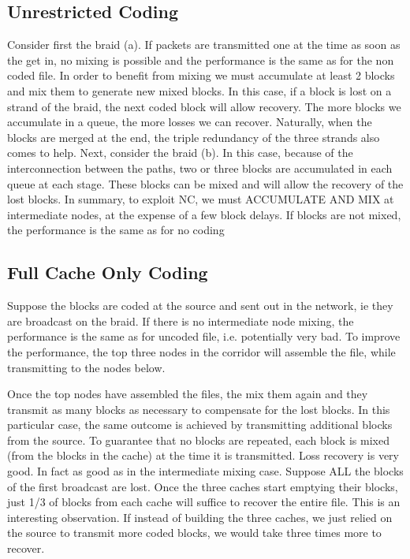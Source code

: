 \subsection{Unrestricted Coding}
	 	 	
 Consider first the braid (a). If packets are transmitted one at the time as soon as the get in, no mixing is possible and the performance is the same as for the non coded file.
In order to benefit from mixing we must accumulate at least 2 blocks and mix them to generate new mixed blocks. In this case, if a block is lost on a strand of the braid, the next coded block will allow recovery. The more blocks we accumulate in a queue, the more losses we can recover. Naturally, when the blocks are merged at the end, the triple redundancy of the three strands also comes to help. Next, consider the braid (b). In this case, because of the interconnection between the paths, two or three blocks are accumulated in each queue at each stage. These blocks can be mixed and will allow the recovery of the lost blocks. In summary, to exploit NC, we must ACCUMULATE AND MIX at intermediate nodes, at the expense of a few block delays. If blocks are not mixed, the performance is the same as for no coding


\subsection{Full Cache Only Coding}
	 	 	
Suppose the blocks are coded at the source and sent out in the network, ie they are broadcast on the braid. If there is no intermediate node mixing, the performance is the same as for uncoded file, i.e. potentially very bad. To improve the performance, the top three nodes in the corridor will assemble the file, while transmitting to the nodes below.

	 	 	
Once the top nodes have assembled the files, the mix them again and they transmit as many blocks as necessary to compensate for the lost blocks. In this particular case, the same outcome is achieved by transmitting additional blocks from the source. To guarantee that no blocks are repeated, each block is mixed (from the blocks in the cache) at the time it is transmitted. Loss recovery is very good. In fact as good as in the intermediate mixing case. Suppose ALL the blocks of the first broadcast are lost. Once the three caches start emptying their blocks, just 1/3 of blocks from each cache will suffice to recover the entire file. This is an interesting observation. If instead of building the three caches, we just relied on the source to transmit more coded blocks, we would take three times more to recover.


